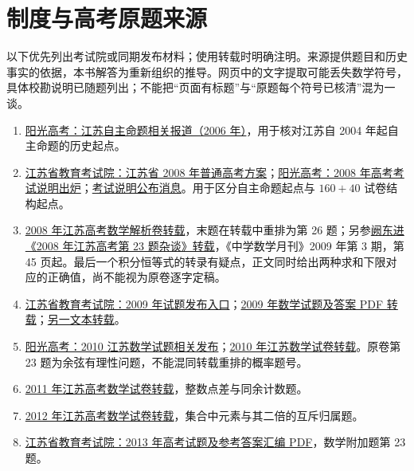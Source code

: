 \documentclass[UTF8,12pt,a4paper,fontset=fandol]{ctexart}
\begin{document}
\section{制度与高考原题来源}\label{sec:sources}
以下优先列出考试院或同期发布材料；使用转载时明确注明。来源提供题目和历史事实的依据，本书解答为重新组织的推导。网页中的文字提取可能丢失数学符号，具体校勘说明已随题列出；不能把“页面有标题”与“原题每个符号已核清”混为一谈。
\begin{enumerate}
\item\label{src:history} \href{https://gaokao.chsi.com.cn/gkxx/ss/200604/20060405/432170.html}{阳光高考：江苏自主命题相关报道（2006 年）}，用于核对江苏自 2004 年起自主命题的历史起点。
\item\label{src:scheme} \href{https://www.jseea.cn/webfile/highschool_ty_artxk_files/2007-05-24/3187.html}{江苏省教育考试院：江苏省 2008 年普通高考方案}；\href{https://gaokao.chsi.com.cn/gkxx/js/200711/20071121/1598706.html}{阳光高考：2008 年高考考试说明出炉}；\href{https://gaokao.chsi.com.cn/gkxx/js/200711/20071121/1598761.html}{考试说明公布消息}。用于区分自主命题起点与 $160+40$ 试卷结构起点。
\item\label{src:g2008} \href{https://www.yeyulingfeng.com/wendang/194472.html}{2008 年江苏高考数学解析卷转载}，末题在转载中重排为第 26 题；另参\href{https://doc.xuehai.net/b69540a89a069c31e3680dd29.html}{阙东进《2008 年江苏高考第 23 题杂谈》转载}，《中学数学月刊》2009 年第 3 期，第 45 页起。最后一个积分恒等式的转录有疑点，正文同时给出两种求和下限对应的正确值，尚不能视为原卷逐字定稿。
\item\label{src:g2009} \href{https://www.jseea.cn/webfile/gaokao/2009-06-09/6597.html}{江苏省教育考试院：2009 年试题发布入口}；\href{https://29805199.s21i.faiusr.com/61/3/ABUIABA9GAAgqP6QowYovoST9wI.pdf}{2009 年数学试题及答案 PDF 转载}；\href{https://www.yeyulingfeng.com/wendang/15424.html}{另一文本转载}。
\item\label{src:g2010} \href{https://gaokao.chsi.com.cn/gkxx/ss/201006/20100612/96768571.html}{阳光高考：2010 江苏数学试题相关发布}；\href{https://www.yeyulingfeng.com/wendang/16407.html}{2010 年江苏数学试卷转载}。原卷第 23 题为余弦有理性问题，不能混同转载重排的概率题号。
\item\label{src:g2011} \href{https://www.yeyulingfeng.com/wendang/202979.html}{2011 年江苏高考数学试卷转载}，整数点差与同余计数题。
\item\label{src:g2012} \href{https://www.yeyulingfeng.com/wendang/21104.html}{2012 年江苏高考数学试卷转载}，集合中元素与其二倍的互斥归属题。
\item\label{src:g2013} \href{https://www.jseea.cn/webfile/upload/old/contents/channel_6/2013/06/1306100857696.pdf}{江苏省教育考试院：2013 年高考试题及参考答案汇编 PDF}，数学附加题第 23 题。

\end{enumerate}
\end{document}
